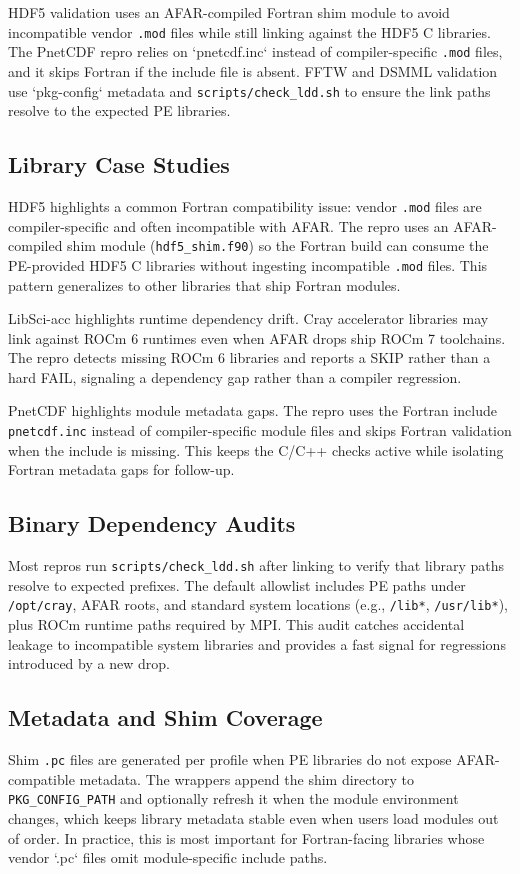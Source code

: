 HDF5 validation uses an AFAR-compiled Fortran shim module to avoid incompatible
vendor \texttt{.mod} files while still linking against the HDF5 C libraries. The
PnetCDF repro relies on `pnetcdf.inc` instead of compiler-specific \texttt{.mod}
files, and it skips Fortran if the include file is absent. FFTW and DSMML
validation use `pkg-config` metadata and \texttt{scripts/check\_ldd.sh} to ensure the
link paths resolve to the expected PE libraries.

\subsection{Library Case Studies}
\label{sec:case-studies}
HDF5 highlights a common Fortran compatibility issue: vendor \texttt{.mod} files are
compiler-specific and often incompatible with AFAR. The repro uses an
AFAR-compiled shim module (\texttt{hdf5\_shim.f90}) so the Fortran build can
consume the PE-provided HDF5 C libraries without ingesting incompatible \texttt{.mod}
files. This pattern generalizes to other libraries that ship Fortran modules.

LibSci-acc highlights runtime dependency drift. Cray accelerator libraries may
link against ROCm 6 runtimes even when AFAR drops ship ROCm 7 toolchains. The
repro detects missing ROCm 6 libraries and reports a SKIP rather than a hard
FAIL, signaling a dependency gap rather than a compiler regression.

PnetCDF highlights module metadata gaps. The repro uses the Fortran include
\texttt{pnetcdf.}\allowbreak\texttt{inc} instead of compiler-specific module
files and skips Fortran validation when the include is missing. This keeps
the C/C++ checks active while isolating Fortran metadata gaps for follow-up.

\subsection{Binary Dependency Audits}
\label{sec:ldd}
Most repros run \texttt{scripts/check\_ldd.sh} after linking to verify that
library paths resolve to expected prefixes. The default allowlist includes PE
paths under \texttt{/opt/cray}, AFAR roots, and standard system locations
(e.g., \texttt{/lib*}, \texttt{/usr/lib*}), plus ROCm runtime paths required by
MPI. This audit catches accidental leakage to incompatible system libraries
and provides a fast signal for regressions introduced by a new drop.

\subsection{Metadata and Shim Coverage}
\label{sec:shims}
Shim \texttt{.pc} files are generated per profile when PE libraries do not expose
AFAR-compatible metadata. The wrappers append the shim directory to
\texttt{PKG\_CONFIG\_PATH} and optionally refresh it when the module
environment changes, which keeps library metadata stable even when users load
modules out of order. In practice, this is most important for Fortran-facing
libraries whose vendor `.pc` files omit module-specific include paths.


